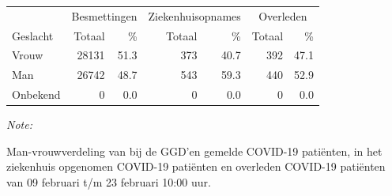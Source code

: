 \documentclass[
  english,
  man,floatsintext]{apa6}
\begin{document}
\begin{table}[H]
\centering\begingroup\fontsize{11}{13}\selectfont

\begin{threeparttable}
\begin{tabular}{lrrrrrr}
\toprule
\multicolumn{1}{c}{ } & \multicolumn{2}{c}{Besmettingen} & \multicolumn{2}{c}{Ziekenhuisopnames} & \multicolumn{2}{c}{Overleden} \\
\cmidrule(l{3pt}r{3pt}){2-3} \cmidrule(l{3pt}r{3pt}){4-5} \cmidrule(l{3pt}r{3pt}){6-7}
Geslacht & Totaal & \% & Totaal & \% & Totaal & \%\\
\midrule
Vrouw & 28131 & 51.3 & 373 & 40.7 & 392 & 47.1\\
Man & 26742 & 48.7 & 543 & 59.3 & 440 & 52.9\\
Onbekend & 0 & 0.0 & 0 & 0.0 & 0 & 0.0\\
\bottomrule
\end{tabular}
\begin{tablenotes}
\item \textit{Note: } 
\item Man-vrouwverdeling van bij de GGD’en gemelde COVID-19 patiënten, in het ziekenhuis opgenomen COVID-19 patiënten en overleden COVID-19 patiënten van 09 februari t/m 23 februari 10:00 uur.
\end{tablenotes}
\end{threeparttable}
\endgroup{}
\end{table}
\newpage
\end{document}

